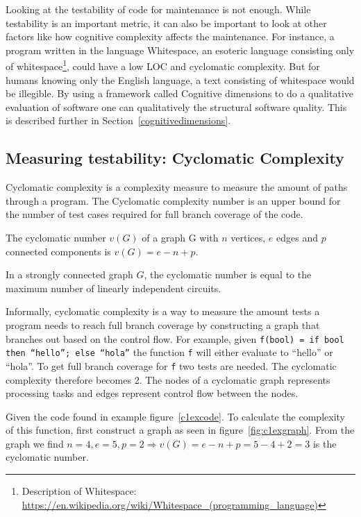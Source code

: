 Looking at the testability of code for maintenance is not enough. While
testability is an important metric, it can also be important to look at other
factors like how cognitive complexity affects the maintenance. For instance, a
program written in the language Whitespace, an esoteric language consisting only
of whitespace\footnote{Description of Whitespace:
\url{https://en.wikipedia.org/wiki/Whitespace_(programming_language)}}, could
have a low LOC and cyclomatic complexity. But for humans knowing only the
English language, a text consisting of whitespace would be illegible. By using a
framework called Cognitive dimensions to do a qualitative evaluation of
software one can qualitatively the structural software quality. This is described
further in Section~\ref{cognitivedimensions}.


\subsection{Measuring testability: Cyclomatic Complexity}\label{cyclomaticcomplexity}

Cyclomatic complexity is a complexity measure to measure the amount of paths
through a program. The Cyclomatic complexity number is an upper bound for the
number of test cases required for full branch coverage of the code. 

\theoremstyle{definition}
\begin{definition}
The cyclomatic number $v(G)$ of a graph G with $n$ vertices, $e$ edges and $p$
connected components is $v(G) = e - n + p$.
\end{definition}

\begin{theorem}
In a strongly connected graph $G$, the cyclomatic number is equal to the
maximum number of linearly independent circuits.~\cite{McCabe}
\end{theorem}

Informally, cyclomatic complexity is a way to measure the amount tests a program
needs to reach full branch coverage by constructing a graph that branches out
based on the control flow. For example, given \texttt{f(bool) = if bool then
``hello''; else ``hola''} the function \texttt{f} will either evaluate to
``hello'' or ``hola''. To get full branch coverage for \texttt{f} two tests are
needed. The cyclomatic complexity therefore becomes 2. The nodes of a cyclomatic
graph represents processing tasks and edges represent control flow between
the nodes. 

Given the code found in example figure~\ref{c1excode}. To calculate the
complexity of this function, first construct a graph as seen in
figure~\ref{fig:c1exgraph}. From the graph we find $n=4, e=5, p=2\Rightarrow
v(G)=e-n+p=5-4+2=3$ is the cyclomatic number.

